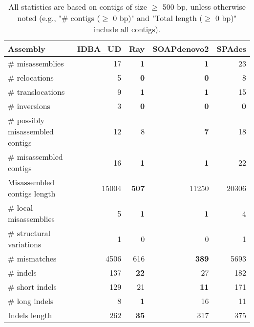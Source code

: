 \documentclass[12pt,a4paper]{article}
\begin{document}
\begin{table}[ht]
\begin{center}
\caption{All statistics are based on contigs of size $\geq$ 500 bp, unless otherwise noted (e.g., "\# contigs ($\geq$ 0 bp)" and "Total length ($\geq$ 0 bp)" include all contigs).}
\begin{tabular}{|l*{4}{|r}|}
\hline
Assembly & IDBA\_UD & Ray & SOAPdenovo2 & SPAdes \\ \hline
\# misassemblies & 17 & {\bf 1} & {\bf 1} & 23 \\ \hline
\hspace{5mm}\# relocations & 5 & {\bf 0} & {\bf 0} & 8 \\ \hline
\hspace{5mm}\# translocations & 9 & {\bf 1} & {\bf 1} & 15 \\ \hline
\hspace{5mm}\# inversions & 3 & {\bf 0} & {\bf 0} & {\bf 0} \\ \hline
\# possibly misassembled contigs & 12 & 8 & {\bf 7} & 18 \\ \hline
\# misassembled contigs & 16 & {\bf 1} & {\bf 1} & 22 \\ \hline
Misassembled contigs length & 15004 & {\bf 507} & 11250 & 20306 \\ \hline
\# local misassemblies & 5 & {\bf 1} & {\bf 1} & 4 \\ \hline
\# structural variations & 1 & 0 & 0 & 1 \\ \hline
\# mismatches & 4506 & 616 & {\bf 389} & 5693 \\ \hline
\# indels & 137 & {\bf 22} & 27 & 182 \\ \hline
\hspace{5mm}\# short indels & 129 & 21 & {\bf 11} & 171 \\ \hline
\hspace{5mm}\# long indels & 8 & {\bf 1} & 16 & 11 \\ \hline
Indels length & 262 & {\bf 35} & 317 & 375 \\ \hline
\end{tabular}
\end{center}
\end{table}
\end{document}
